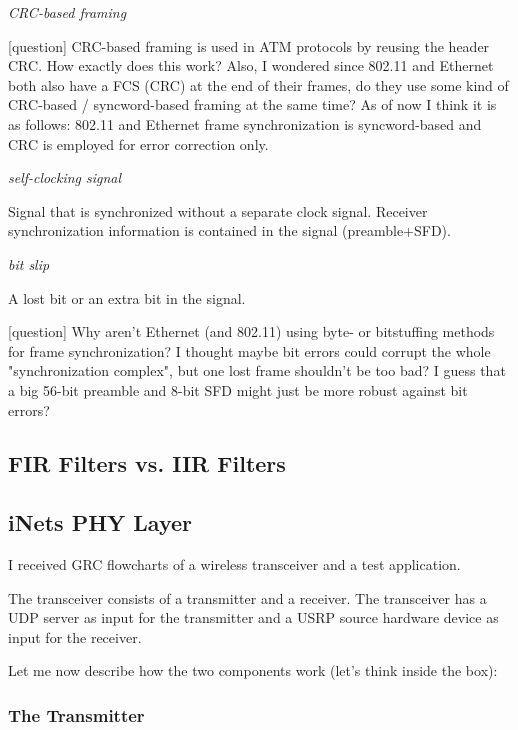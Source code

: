 \documentclass{article}
\begin{document}
\bigskip

\emph{CRC-based framing}

\color{blue}
[question] CRC-based framing is used in ATM protocols by reusing the header CRC. How exactly does this work? Also, I wondered since 802.11 and Ethernet both also have a FCS (CRC) at the end of their frames, do they use some kind of CRC-based / syncword-based framing at the same time? As of now I think it is as follows: 802.11 and Ethernet frame synchronization is syncword-based and CRC is employed for error correction only.
\color{black}

\bigskip

\emph{self-clocking signal}

Signal that is synchronized without a separate clock signal. Receiver synchronization information is contained in the signal (preamble+SFD).

\bigskip

\emph{bit slip}

A lost bit or an extra bit in the signal.

\bigskip

\color{blue}
[question] Why aren't Ethernet (and 802.11) using byte- or bitstuffing methods for frame synchronization? I thought maybe bit errors could corrupt the whole "synchronization complex", but one lost frame shouldn't be too bad? I guess that a big 56-bit preamble and 8-bit SFD might just be more robust against bit errors?
\color{black}

\subsection{FIR Filters vs. IIR Filters}

\subsection{iNets PHY Layer}

I received GRC flowcharts of a wireless transceiver and a test application.

\bigskip

The transceiver consists of a transmitter and a receiver. The transceiver has a UDP server as input for the transmitter and a USRP source hardware device as input for the receiver. 

\bigskip

Let me now describe how the two components work (let's think inside the box):

\subsubsection{The Transmitter}
\end{document}
